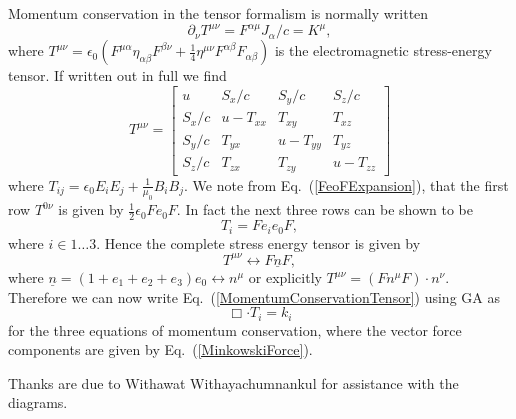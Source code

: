 \documentclass[12pt,aps,prb,preprint]{revtex4}   %
\newcommand{\be}{\begin{equation}}
\newcommand{\ee}{\end{equation}}
\begin{document}
Momentum conservation in the tensor formalism is normally written
\be \label{MomentumConservationTensor}
\partial_{\nu} T^{\mu \nu} = F^{\alpha \mu} J_{\alpha} /c = K^{\mu}, 
\ee
where $ T^{\mu \nu} = \epsilon_0 ( F^{\mu \alpha } \eta_{\alpha \beta} F^{\beta \nu} + \frac{1}{4} \eta^{\mu \nu} F^{\alpha \beta} F_{\alpha \beta} ) $ is the electromagnetic stress-energy tensor. If written out in full we find
\be \label{EMStressEnergyMatrix}
T^{\mu \nu } = \begin{bmatrix} u & S_x/c & S_y/c & S_z/c \\
S_x/c & u - T_{xx}  & T_{xy} & T_{xz} \\
S_y/c & T_{yx} & u - T_{yy} & T_{yz} \\
S_z/c & T_{zx} & T_{zy} & u - T_{zz}\end{bmatrix} 
\ee
where $ T_{ij} = \epsilon_0 E_i E_j + \frac{1}{\mu_0} B_i B_j $.
We note from Eq.~(\ref{FeoFExpansion}), that the first row $ T^{0 \nu } $ is given by $ \frac{1}{2} \epsilon_0 F e_0 F $.  In fact the next three rows can be shown to be 
\be
T_i = F e_i e_0 F ,
\ee
where $ i \in 1 \dots 3$.  Hence the complete stress energy tensor is given by  \cite{Hestenes:1966}
\be \label{eq:StressEnergyTensorGAe0}
T^{\mu \nu} \leftrightarrow F \underline{n} F ,
\ee
where $  \underline{n} = (1 + e_1 +e_2 +e_3) e_0  \leftrightarrow n^{\mu } $ or explicitly $ T^{\mu \nu} = (F n^{\mu} F) \cdot n^{\nu} $.
Therefore we can now write Eq.~(\ref{MomentumConservationTensor}) using GA as
\be \label{GAMomentumConservation}
\Box \cdot T_i  = k_i 
\ee
for the three equations of momentum conservation, where the vector force components are given by Eq.~(\ref{MinkowskiForce}).  


\begin{acknowledgments}
Thanks are due to Withawat Withayachumnankul for assistance with the diagrams.
\end{acknowledgments}
\end{document}
